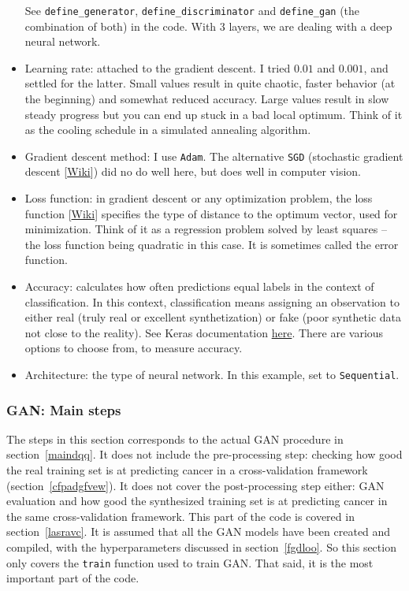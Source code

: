 \documentclass[oneside,10pt]{book}
\begin{document}
\begin{itemize}
See 
\texttt{define\_generator}, \texttt{define\_discriminator}
 and \texttt{define\_gan} (the combination of both) in the code. With 3 layers, we are dealing with a
 \textcolor{index}{deep neural network}.
\item Learning rate: attached to the gradient descent. I tried $0.01$ and $0.001$, and settled for the latter. Small values result in quite chaotic, faster behavior (at the beginning) and somewhat reduced accuracy. Large values result in slow steady progress but you can end up stuck in a bad local optimum. Think
 of it as the cooling schedule in a simulated annealing algorithm. 
\item Gradient descent method: I use \texttt{Adam}. The alternative \texttt{SGD} 
(\textcolor{index}{stochastic gradient descent} [\href{https://en.wikipedia.org/wiki/Stochastic_gradient_descent}{Wiki}]) did no do well here, but does well in computer vision.
\item Loss function: in gradient descent or any optimization problem, the \textcolor{index}{loss function} [\href{https://en.wikipedia.org/wiki/Loss_function}{Wiki}] specifies the type of distance to the optimum vector, used for minimization. Think of it as a regression problem solved by least squares -- the loss function being quadratic in this case. It is sometimes called the error function. 
\item Accuracy: calculates how often predictions equal labels in the context of classification. In this context, classification means assigning
 an observation to either real (truly real or excellent synthetization) or fake (poor synthetic data not close to the reality).
See Keras documentation \href{https://keras.io/api/metrics/accuracy_metrics/}{here}. There are various options to choose from, to measure accuracy.
\item Architecture: the type of neural network. In this example, set to \texttt{Sequential}. 
\end{itemize}



\subsubsection{GAN: Main steps}

The steps in this section corresponds to the actual GAN procedure in section~\ref{maindqq}. It does not include the pre-processing step: checking how good the real training set is at predicting cancer in a 
\textcolor{index}{cross-validation}
  framework (section~\ref{cfpadgfvew}). It does not cover the post-processing step either: 
 GAN evaluation and how good the synthesized training set is at predicting cancer in the same cross-validation framework. This part of the code is covered 
 in section~\ref{lasravc}. It is assumed that all the GAN models have been created and compiled, with the hyperparameters discussed
in section~\ref{fgdloo}. So this section only covers the \texttt{train} function used to train GAN.  That said, it is the most important part of the code.
\end{document}
